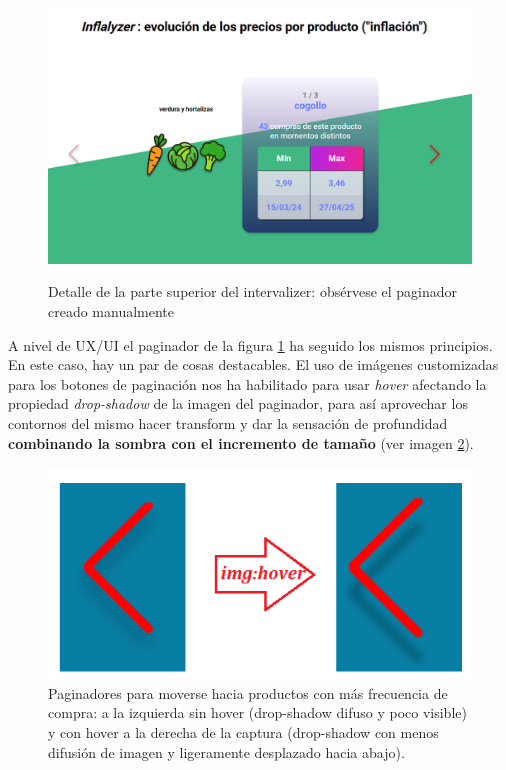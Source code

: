 \documentclass[a4paper,12pt]{report}
\begin{document}
	\FloatBarrier
	\begin{figure}[H]
		\centering
		\caption{Detalle de la parte superior del intervalizer: obsérvese el paginador creado manualmente}
		\includegraphics[width=1\linewidth]{img/imatgeSwiperCustom.png}
		\label{fig:imatgeSwiperCustom}
	\end{figure}
	\FloatBarrier
	
	A nivel de UX/UI el paginador de la figura \ref{fig:imatgeSwiperCustom} ha seguido los mismos principios. En este caso, hay un par de cosas destacables. El uso de imágenes customizadas para los botones de paginación nos ha habilitado para usar \textit{hover} afectando la propiedad \textit{drop-shadow} de la imagen del paginador, para así aprovechar los contornos del mismo hacer transform y dar la sensación de profundidad \textbf{combinando la sombra con el incremento de tamaño} (ver imagen \ref{fig:paginadorscustom}).
	

	\FloatBarrier
	\begin{figure}[H]
		\centering
		\caption{Paginadores para moverse hacia productos con más frecuencia de compra: a la izquierda sin hover (drop-shadow difuso y poco visible) y con hover a la derecha de la captura (drop-shadow con menos difusión de imagen y ligeramente desplazado hacia abajo).}
		\includegraphics[width=1\linewidth]{img/paginadorsCustom}

		\label{fig:paginadorscustom}
	\end{figure}
	\FloatBarrier
	
\end{document}
